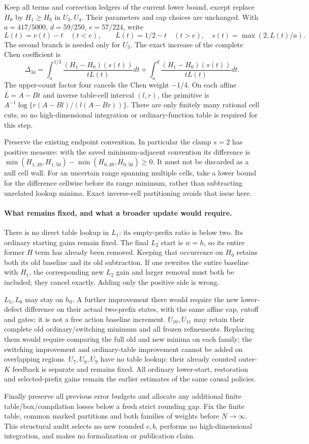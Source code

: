Keep all terms and correction ledgers of the current lower bound,
except replace $H_0$ by $H_1\ge H_0$ in $U_3,U_4$. Their parameters
and cap choices are unchanged. With $a=417/5000$, $d=59/250$,
$e=57/224$, write
\[
 L(t)=v(t)-t\quad(t<e),\qquad L(t)=1/2-t\quad(t>e),
 \quad s(t)=\max(2,L(t)/a).
\]
The second branch is needed only for $U_3$. The exact increase of
the complete Chen coefficient is
\[
 \Delta_{34}=\int_a^{1/3}\frac{(H_1-H_0)(s(t))}{tL(t)}dt
             +\int_a^d\frac{(H_1-H_0)(s(t))}{tL(t)}dt.
\]
The upper-count factor four cancels the Chen weight $-1/4$.
On each affine $L=A-Bt$ and inverse table-cell interval $(l,r)$,
the primitive is $A^{-1}\log\{r(A-Bl)/(l(A-Br))\}$.
There are only finitely many rational cell cuts, so no high-dimensional
integration or ordinary-function table is required for this step.

Preserve the existing endpoint convention. In particular the clamp
$s=2$ has positive measure: with the saved minimum-adjacent convention
its difference is
$\min(H_{1,49},H_{1,50})-\min(H_{0,49},H_{0,50})\ge0$.
It must not be discarded as a null cell wall. For an uncertain range
spanning multiple cells, take a lower bound for the difference cellwise
before its range minimum, rather than subtracting unrelated lookup
minima. Exact inverse-cell partitioning avoids that issue here.

\paragraph{What remains fixed, and what a broader update would require.}
There is no direct table lookup in $L_1$: its empty-prefix ratio is
below two. Its ordinary starting gains remain fixed. The final $L_2$
start is $w=h$, so its entire former $H$ term has already been removed.
Keeping that occurrence on $H_0$ retains both its old baseline and
its old subtraction. If one rewrites the entire baseline with $H_1$,
the corresponding new $L_2$ gain and larger removal must both be
included; they cancel exactly. Adding only the positive side is wrong.

$L_5,L_6$ may stay on $h_0$. A further improvement there would require
the new lower-defect difference on their actual two-prefix states,
with the same affine cap, cutoff and gates; it is not a free action
baseline increment. $U_{10},U_{11}$ may retain their complete old
ordinary/switching minimum and all frozen refinements. Replacing them
would require comparing the full old and new minima on each family;
the switching improvement and ordinary-table improvement cannot be
added on overlapping regions. $U_7,U_8,U_9$ have no table lookup;
their already counted outer-$K$ feedback is separate and remains fixed.
All ordinary lower-start, restoration and selected-prefix gains remain
the earlier estimates of the same causal policies.

Finally preserve all previous error budgets and allocate any additional
finite table/box/compilation losses below a fresh strict rounding gap.
Fix the finite table, common marked partitions and both families of
weights before $N\to\infty$. This structural audit selects no new
rounded $c,b$, performs no high-dimensional integration, and makes no
formalization or publication claim.
